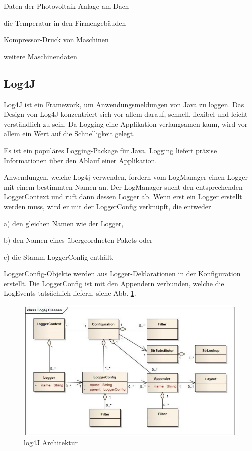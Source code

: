 \begin{compactitem}
    \item Daten der Photovoltaik-Anlage am Dach
    \item die Temperatur in den Firmengebäuden
    \item Kompressor-Druck von Maschinen
    \item weitere Maschinendaten
\end{compactitem}

\subsection{Log4J}
Log4J ist ein Framework, um Anwendungsmeldungen von Java zu loggen.
Das Design von Log4J konzentriert sich vor allem darauf, schnell, flexibel und leicht verständlich zu sein. Da Logging eine Applikation verlangsamen kann, wird vor allem ein Wert auf die Schnelligkeit gelegt. \cite{log4JBuch} 

Es ist ein populäres Logging-Package für Java. Logging liefert präzise Informationen über den Ablauf einer Applikation. \cite{log4J}


Anwendungen, welche Log4j verwenden, fordern vom LogManager einen Logger mit einem bestimmten Namen an. Der LogManager sucht den entsprechenden LoggerContext und ruft dann dessen Logger ab. 
Wenn erst ein Logger erstellt werden muss, wird er mit der LoggerConfig verknüpft, die entweder 

\begin{compactitem}
    \item[a)] den gleichen Namen wie der Logger, 
    \item[b)] den Namen eines übergeordneten Pakets oder 
    \item[c)] die Stamm-LoggerConfig enthält.
\end{compactitem}

LoggerConfig-Objekte werden aus Logger-Deklarationen in der Konfiguration erstellt. Die LoggerConfig ist mit den Appendern verbunden, welche die LogEvents tatsächlich liefern, siehe Abb. \ref{fig:impl:log4jArchitektur}. \cite{log4J}

\begin{figure}[h t]
    \centering
    \includegraphics[scale=0.7]{pics/log4jArchitektur.jpg}
    \caption{log4J Architektur \cite{log4J}}
    \label{fig:impl:log4jArchitektur}
\end{figure}